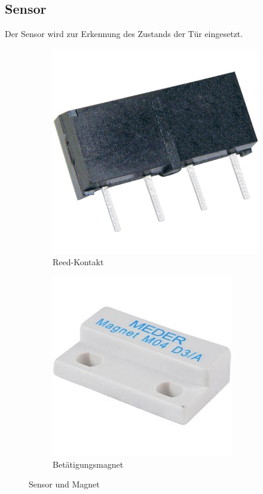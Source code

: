 \subsection{Sensor}
Der Sensor wird zur Erkennung des Zustands der T\"ur eingesetzt.
\begin{figure}[h]
    \centering
    \begin{subfigure}[t]{0.5\textwidth}
        \centering
        \includegraphics[scale=0.05]{images/sensor}
        \caption{\cite{img04} Reed-Kontakt}
    \end{subfigure}%
    \begin{subfigure}[t]{0.5\textwidth}
        \centering
        \includegraphics[scale=0.2]{images/MAGNET_M4}
        \caption{\cite{img05} Bet\"atigungsmagnet}
    \end{subfigure}
    \caption{Sensor und Magnet}
    \label{fig:sensor}
\end{figure}

